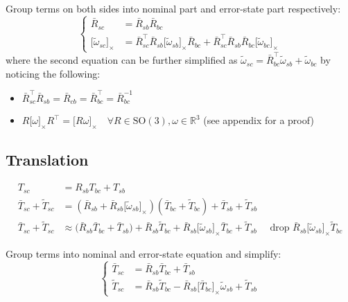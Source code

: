 \documentclass[letter,10pt]{article}
\newcommand{\SO}[1]{ \mathrm{SO(#1)} }
\newcommand{\real}{\mathbb{R}}
\newcommand{\asym}[1]{{\lbrack #1\rbrack}_\times{}}
\begin{document}
Group terms on both sides into nominal part and error-state part respectively:
\begin{equation}
\begin{cases}
\bar R_{sc} &= \bar R_{sb} \bar R_{bc}\\
\asym{\tilde \omega_{sc}} &= \bar R_{sc}^\top \bar R_{sb} \asym{\tilde\omega_{sb}} \bar R_{bc} + \bar R_{sc}^\top \bar R_{sb} \bar R_{bc} \asym{\tilde\omega_{bc}}
\end{cases}
\end{equation}
where the second equation can be further simplified as $\tilde \omega_{sc} = \bar R_{bc}^\top \tilde \omega_{sb} + \tilde \omega_{bc}$ by noticing the following:
\begin{itemize}
 \item 
$\bar R_{sc}^\top \bar R_{sb}=\bar R_{cb} = \bar R_{bc}^\top = \bar R_{bc}^{-1}$ 
\item
$R \asym{\omega} R^\top=\asym{R \omega} \quad \forall R \in \SO{3}, \omega \in \real^3$ (see appendix for a proof)
\end{itemize}

\subsection{Translation}
\begin{equation}
\begin{aligned}
T_{sc} &= R_{sb} T_{bc} + T_{sb} \\
\bar T_{sc} + \tilde T_{sc} &= (\bar R_{sb} + \bar R_{sb} \asym{\tilde \omega_{sb}}) (\bar T_{bc} + \tilde T_{bc}) + \bar T_{sb} + \tilde T_{sb} \\
\bar T_{sc} + \tilde T_{sc} &\approx \big(\bar R_{sb} \bar T_{bc} + \bar T_{sb} \big)
+ \bar R_{sb} \tilde T_{bc} + \bar R_{sb} \asym{\tilde \omega_{sb}} \bar T_{bc} + \tilde T_{sb} \quad \text{ drop } \bar R_{sb} \asym{\tilde \omega_{sb}} \tilde  T_{bc}
\end{aligned}
\end{equation}

Group terms into nominal and error-state equation and simplify:
\begin{equation}
\begin{cases}
 \bar T_{sc} &= \bar R_{sb} \bar T_{bc} + \bar T_{sb} \\
 \tilde T_{sc} &= \bar R_{sb} \tilde T_{bc} - \bar R_{sb} \asym{\bar T_{bc}} \tilde \omega_{sb} + \tilde T_{sb}
\end{cases}
\end{equation}
\end{document}
